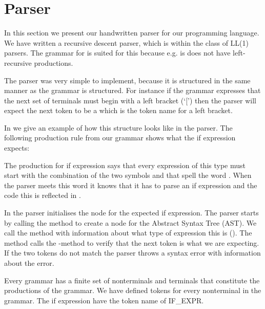 \section{Parser}

In this section we present our handwritten parser for our programming language. We have written a recursive descent parser, which is within the class of LL(1) parsers. The grammar for \productname{} is suited for this because e.g. is does not have left-recursive productions. 

The parser was very simple to implement, because it is structured in the same manner as the grammar is structured. For instance if the grammar expresses that the next set of terminals must begin with a left bracket (`[') then the parser will expect the next token to be a  which is the token name for a left bracket. 

In  we give an example of how this structure looks like in the parser. The following production rule from our grammar shows what the if expression expects:

\begin{ebnf}
\end{ebnf}

The production for if expression says that every expression of this type must start with the combination of the two symbols  and  that spell the word . When the parser meets this word it knows that it has to parse an if expression and the code this is reflected in .



In  the parser initialises the node for the expected if expression. The parser starts by calling the method  to create a node for the Abstract Syntax Tree (AST). We call the method with information about what type of expression this is (). The method calls the -method to verify that the next token is what we are expecting. If the two tokens do not match the parser throws a syntax error with information about the error.

Every grammar has a finite set of nonterminals and terminals that constitute the productions of the grammar. We have defined tokens for every nonterminal in the grammar. The if expression have the token name of IF\_EXPR. 

